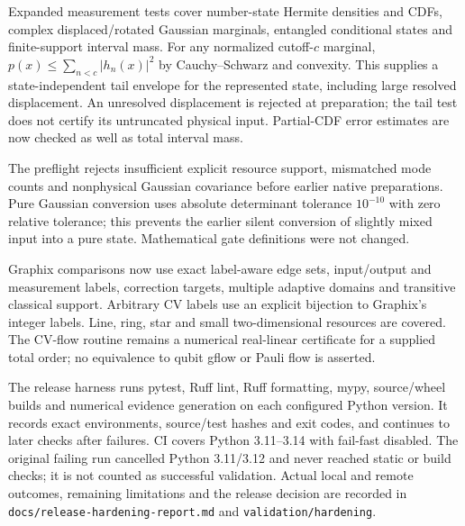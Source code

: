 Expanded measurement tests cover number-state Hermite densities and CDFs,
complex displaced/rotated Gaussian marginals, entangled conditional states and
finite-support interval mass. For any normalized cutoff-$c$ marginal,
$p(x)\leq\sum_{n<c}|h_n(x)|^2$ by Cauchy--Schwarz and convexity. This supplies
a state-independent tail envelope for the represented state, including large
resolved displacement. An unresolved displacement is rejected at preparation;
the tail test does not certify its untruncated physical input. Partial-CDF error
estimates are now checked as well as total interval mass.

The preflight rejects insufficient explicit resource support, mismatched mode
counts and nonphysical Gaussian covariance before earlier native preparations.
Pure Gaussian conversion uses absolute determinant tolerance $10^{-10}$ with
zero relative tolerance; this prevents the earlier silent conversion of slightly
mixed input into a pure state. Mathematical gate definitions were not changed.

Graphix comparisons now use exact label-aware edge sets, input/output and
measurement labels, correction targets, multiple adaptive domains and transitive
classical support. Arbitrary CV labels use an explicit bijection to Graphix's
integer labels. Line, ring, star and small two-dimensional resources are covered.
The CV-flow routine remains a numerical real-linear certificate for a supplied
total order; no equivalence to qubit gflow or Pauli flow is asserted.

The release harness runs pytest, Ruff lint, Ruff formatting, mypy, source/wheel
builds and numerical evidence generation on each configured Python version.
It records exact environments, source/test hashes and exit codes, and continues
to later checks after failures. CI covers Python 3.11--3.14 with fail-fast disabled.
The original failing run cancelled Python 3.11/3.12 and never reached static or
build checks; it is not counted as successful validation. Actual local and remote
outcomes, remaining limitations and the release decision are recorded in
\texttt{docs/release-hardening-report.md} and \texttt{validation/hardening}.
